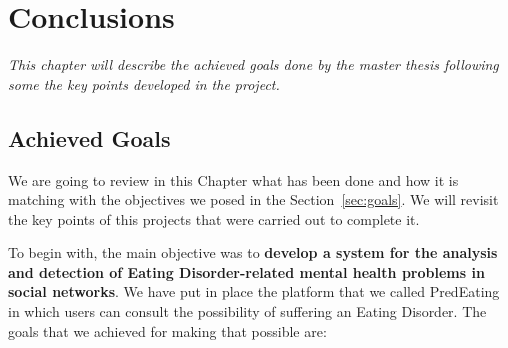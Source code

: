 \chapter{Conclusions}
\label{chap:conclusions}
\textit{This chapter will describe the achieved goals done by the master thesis following some the key points developed in the project.}

\clearpage
\section{Achieved Goals}
We are going to review in this Chapter what has been done and how it is matching with the objectives we posed in the Section~\ref{sec:goals}. We will revisit the key points of this projects that were carried out to complete it.

To begin with, the main objective was to \textbf{develop a system for the analysis and detection of Eating Disorder-related mental health problems in social networks}. We have put in place the platform that we called PredEating in which users can consult the possibility of suffering an Eating Disorder. The goals that we achieved for making that possible are:
